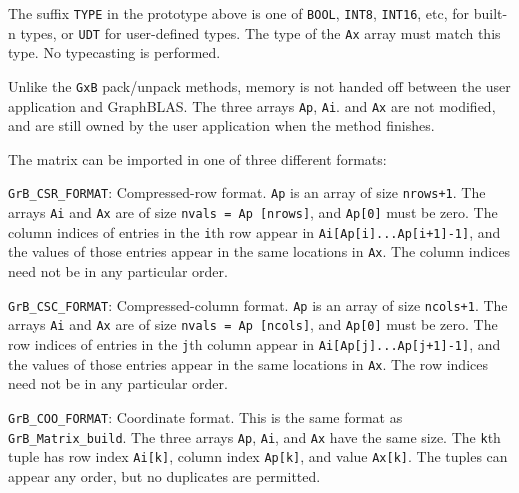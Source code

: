 \documentclass[12pt]{article}
\newenvironment{packed_itemize}{
\begin{itemize}
  \setlength{\itemsep}{1pt}
  \setlength{\parskip}{0pt}
  \setlength{\parsep}{0pt}
}{\end{itemize}}
\begin{document}
The suffix \verb'TYPE' in the prototype above is one of \verb'BOOL',
\verb'INT8', \verb'INT16', etc, for built-n types, or \verb'UDT' for
user-defined types.  The type of the \verb'Ax' array must match this type.  No
typecasting is performed.

Unlike the \verb'GxB'
pack/unpack methods, memory is not handed off between the user application
and GraphBLAS.   The three arrays \verb'Ap', \verb'Ai'.  and \verb'Ax' are not
modified, and are still owned by the user application when the method finishes.

The matrix can be imported in one of three different formats:

\begin{packed_itemize}
    \item \verb'GrB_CSR_FORMAT': %
        Compressed-row format.  \verb'Ap' is an array of size \verb'nrows+1'.
        The arrays \verb'Ai' and \verb'Ax' are of size \verb'nvals = Ap [nrows]',
        and \verb'Ap[0]' must be zero.
        The column indices of entries in the \verb'i'th row appear in
        \verb'Ai[Ap[i]...Ap[i+1]-1]', and the values of those entries appear in
        the same locations in \verb'Ax'.
        The column indices need not be in any particular order.

    \item \verb'GrB_CSC_FORMAT': %
        Compressed-column format.  \verb'Ap' is an array of size \verb'ncols+1'.
        The arrays \verb'Ai' and \verb'Ax' are of size \verb'nvals = Ap [ncols]',
        and \verb'Ap[0]' must be zero.
        The row indices of entries in the \verb'j'th column appear in
        \verb'Ai[Ap[j]...Ap[j+1]-1]', and the values of those entries appear in
        the same locations in \verb'Ax'.
        The row indices need not be in any particular order.

    \item \verb'GrB_COO_FORMAT': %
        Coordinate format.  This is the same format as \newline
        \verb'GrB_Matrix_build'.
        The three arrays \verb'Ap', \verb'Ai', and \verb'Ax' have the same
        size.  The \verb'k'th tuple has row index \verb'Ai[k]',
        column index \verb'Ap[k]', and value \verb'Ax[k]'.  The tuples can
        appear any order, but no duplicates are permitted.

%

\end{packed_itemize}
\end{document}
